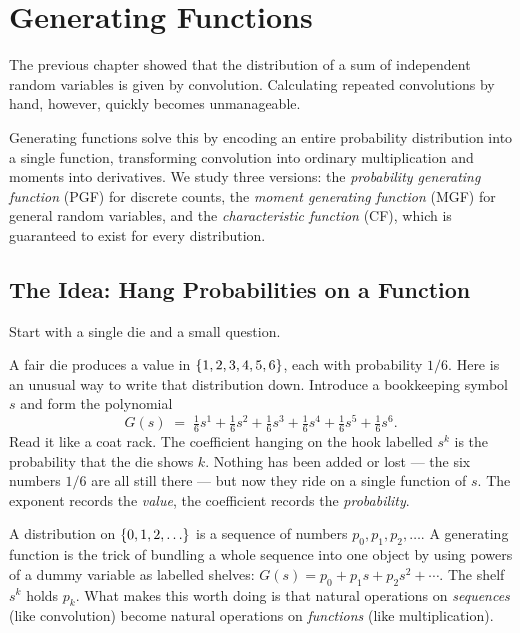 \chapter{Generating Functions}

The previous chapter showed that the distribution of a sum of independent random
variables is given by convolution. Calculating repeated convolutions by hand,
however, quickly becomes unmanageable.

Generating functions solve this by encoding an entire probability distribution
into a single function, transforming convolution into ordinary multiplication
and moments into derivatives. We study three versions: the \emph{probability
generating function} (PGF) for discrete counts, the \emph{moment generating
function} (MGF) for general random variables, and the \emph{characteristic
function} (CF), which is guaranteed to exist for every distribution.

\chapterline

\section{The Idea: Hang Probabilities on a Function}
\label{ch18:idea}

Start with a single die and a small question.

A fair die produces a value in $\{1,2,3,4,5,6\}$, each with probability
$1/6$. Here is an unusual way to write that distribution down. Introduce a
bookkeeping symbol $s$ and form the polynomial
\[
  G(s) \;=\; \tfrac16 s^1 + \tfrac16 s^2 + \tfrac16 s^3
            + \tfrac16 s^4 + \tfrac16 s^5 + \tfrac16 s^6 .
\]
Read it like a coat rack. The coefficient hanging on the hook labelled $s^k$ is
the probability that the die shows $k$. Nothing has been added or lost --- the
six numbers $1/6$ are all still there --- but now they ride on a single
function of $s$. The exponent records the \emph{value}, the coefficient records
the \emph{probability}.

\begin{intuitionbox}
A distribution on $\set{0,1,2,\dots}$ is a sequence of numbers
$p_0,p_1,p_2,\dots$. A generating function is the trick of bundling a whole
sequence into one object by using powers of a dummy variable as labelled
shelves: $G(s)=p_0 + p_1 s + p_2 s^2 + \cdots$. The shelf $s^k$ holds $p_k$.
What makes this worth doing is that natural operations on \emph{sequences}
(like convolution) become natural operations on \emph{functions} (like
multiplication).
\end{intuitionbox}

